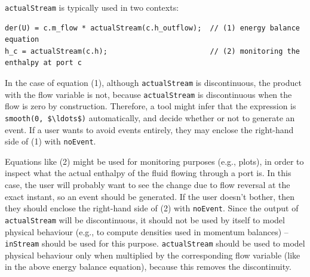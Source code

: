 \begin{nonnormative}
\lstinline!actualStream! is typically used in two contexts:
\begin{lstlisting}[language=modelica]
der(U) = c.m_flow * actualStream(c.h_outflow);  // (1) energy balance equation
h_c = actualStream(c.h);                        // (2) monitoring the enthalpy at port c
\end{lstlisting}
In the case of equation (1), although \lstinline!actualStream! is discontinuous, the product with the flow variable is not, because \lstinline!actualStream! is discontinuous when the flow is zero by construction.
Therefore, a tool might infer that the expression is \lstinline!smooth(0, $\ldots$)! automatically, and decide whether or not to generate an event.
If a user wants to avoid events entirely, they may enclose the right-hand side of (1) with \lstinline!noEvent!.

Equations like (2) might be used for monitoring purposes (e.g., plots), in order to inspect what the actual enthalpy of the fluid flowing through a port is.
In this case, the user will probably want to see the change due to flow reversal at the exact instant, so an event should be generated.
If the user doesn't bother, then they should enclose the right-hand side of (2) with \lstinline!noEvent!.
Since the output of \lstinline!actualStream! will be discontinuous, it should not be used by itself to model physical behaviour (e.g., to compute densities used in momentum balances) -- \lstinline!inStream! should be used for this purpose.
\lstinline!actualStream! should be used to model physical behaviour only when multiplied by the corresponding flow variable (like in the above energy balance equation), because this removes the discontinuity.
\end{nonnormative}
